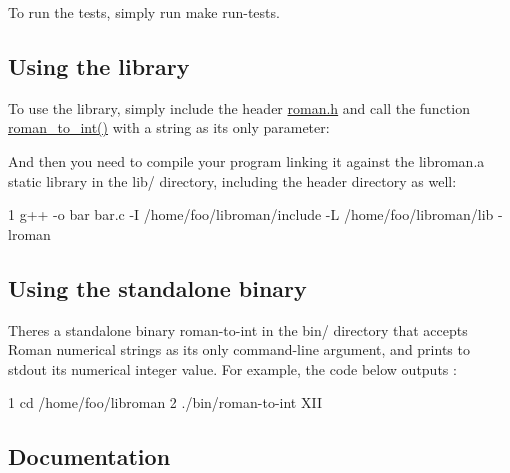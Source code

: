 To run the tests, simply run {\ttfamily make run-\/tests}.

\subsection*{Using the library }

To use the library, simply include the header \hyperlink{roman_8h}{roman.\+h} and call the function \hyperlink{roman_8c_a5d15ad3ed29e4dc0fed9b718523c48c8}{roman\+\_\+to\+\_\+int()} with a string as its only parameter\+:




And then you need to compile your program linking it against the {\ttfamily libroman.\+a} static library in the {\ttfamily lib/} directory, including the header directory as well\+:


\begin{DoxyCode}
1 g++ -o bar bar.c -I /home/foo/libroman/include -L /home/foo/libroman/lib -lroman
\end{DoxyCode}


\subsection*{Using the standalone binary }

There\textquotesingle{}s a standalone binary {\ttfamily roman-\/to-\/int} in the {\ttfamily bin/} directory that accepts Roman numerical strings as its only command-\/line argument, and prints to stdout its numerical integer value. For example, the code below outputs {}\+:


\begin{DoxyCode}
1 cd /home/foo/libroman
2 ./bin/roman-to-int XII
\end{DoxyCode}


\subsection*{Documentation }

